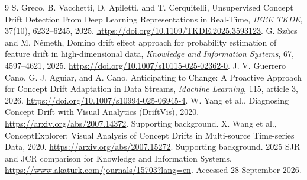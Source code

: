 \documentclass[10pt,a4paper]{article}
\begin{document}
\begin{thebibliography}{9}\small
{} S. Greco, B. Vacchetti, D. Apiletti, and T. Cerquitelli, Unsupervised Concept Drift Detection From Deep Learning Representations in Real-Time, \emph{IEEE TKDE}, 37(10), 6232--6245, 2025. \url{https://doi.org/10.1109/TKDE.2025.3593123}.
 G. Sz\H{u}cs and M. N\'emeth, Domino drift effect approach for probability estimation of feature drift in high-dimensional data, \emph{Knowledge and Information Systems}, 67, 4597--4621, 2025. \url{https://doi.org/10.1007/s10115-025-02362-0}.
 J. V. Guerrero Cano, G. J. Aguiar, and A. Cano, Anticipating to Change: A Proactive Approach for Concept Drift Adaptation in Data Streams, \emph{Machine Learning}, 115, article 3, 2026. \url{https://doi.org/10.1007/s10994-025-06945-4}.
 W. Yang et al., Diagnosing Concept Drift with Visual Analytics (DriftVis), 2020. \url{https://arxiv.org/abs/2007.14372}. Supporting background.
 X. Wang et al., ConceptExplorer: Visual Analysis of Concept Drifts in Multi-source Time-series Data, 2020. \url{https://arxiv.org/abs/2007.15272}. Supporting background.
 2025 SJR and JCR comparison for Knowledge and Information Systems. \url{https://www.akaturk.com/journals/15703?lang=en}. Accessed 28 September 2026.
\end{thebibliography}
\end{document}
